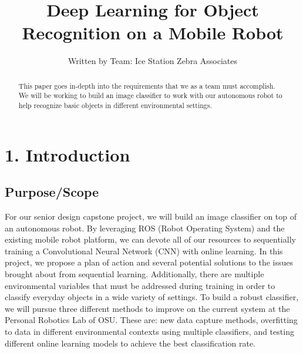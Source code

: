 \documentclass[a4paper, 10pt]{article}
\title{Deep Learning for Object Recognition on a Mobile Robot}
\date{\parbox{\linewidth}{\centering%
  \today\endgraf Oregon State University \endgraf CS 461 Fall 2017 \endgraf {Michael Rodriguez, Julian Weisbord, Miles McCall}}}
\author{Written by Team: Ice Station Zebra Associates}
\begin{document}
\maketitle

\begin{abstract}
This paper goes in-depth into the requirements that we as a team must accomplish. We will be working to build an image classifier to work with our autonomous robot to help recognize basic objects in different environmental settings. 
\end{abstract}
\newpage

\section{1. Introduction}
\subsection{Purpose/Scope}
For our senior design capstone project, we will build an image classifier on top of an autonomous robot. By leveraging ROS (Robot Operating System)  and the existing mobile robot platform, we can devote all of our resources to sequentially training a Convolutional Neural Network (CNN) with online learning. In this project, we propose a plan of action and several potential solutions to the issues brought about from sequential learning. Additionally, there are multiple environmental variables that must be addressed during training in order to classify everyday objects in a wide variety of settings. To build a robust classifier, we will pursue three different methods to improve on the current system at the Personal Robotics Lab of OSU. These are: new data capture methods, overfitting to data in different environmental contexts using multiple classifiers, and testing different online learning models to achieve the best classification rate.
\end{document}
